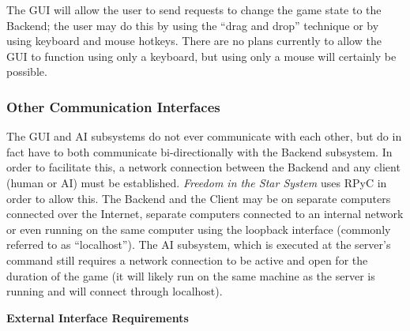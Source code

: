 \documentclass[twoside,letterpaper]{article}
\begin{document}
The GUI will allow the user to send requests to change the game state to the Backend; the user may do this by using the ``drag and drop'' technique or by using keyboard and mouse hotkeys.  There are no plans currently to allow the GUI to function using only a keyboard, but using only a mouse will certainly be possible.

\subsubsection{Other Communication Interfaces}
The GUI and AI subsystems do not ever communicate with each other, but do in fact have to both communicate bi-directionally with the Backend subsystem.  In order to facilitate this, a network connection between the Backend and any client (human or AI) must be established.  \textit{Freedom in the Star System} uses RPyC in order to allow this.  The Backend and the Client may be on separate computers connected over the Internet, separate computers connected to an internal network or even running on the same computer using the loopback interface (commonly referred to as ``localhost'').  The AI subsystem, which is executed at the server's command still requires a network connection to be active and open for the duration of the game (it will likely run on the same machine as the server is running and will connect through localhost).



\begin{minipage}{\linewidth}
\centering
\textbf{External Interface Requirements}
\end{minipage}

\end{document}
